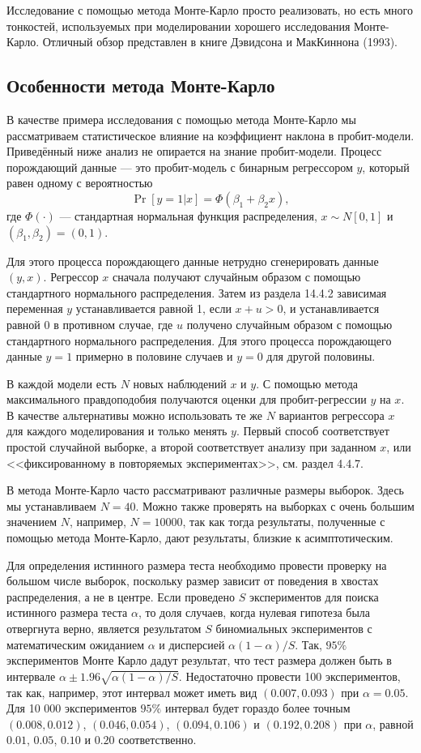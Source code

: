 Исследование с помощью метода Монте-Карло просто реализовать, но есть много тонкостей, используемых при моделировании хорошего исследования Монте-Карло. Отличный обзор представлен в книге Дэвидсона и МакКиннона (1993).


\subsection{Особенности метода Монте-Карло}

В качестве примера исследования с помощью метода Монте-Карло мы рассматриваем статистическое влияние на коэффициент наклона в пробит-модели. Приведённый ниже анализ не опирается на знание пробит-модели. Процесс порождающий данные --- это пробит-модель с бинарным регрессором $y$, который равен одному с вероятностью
\[
\Pr[y = 1|x] = \Phi(\beta_1 + \beta_2 x),
\]
где $\Phi(\cdot)$ --- стандартная нормальная функция распределения, $x \sim N[0,1]$ и $(\beta_1,\beta_2) = (0, 1)$.

Для этого процесса порождающего данные нетрудно сгенерировать данные $(y,x)$. Регрессор $x$ сначала получают случайным образом с помощью стандартного нормального распределения. Затем из раздела 14.4.2 зависимая переменная $y$ устанавливается равной 1, если $x + u > 0$, и устанавливается равной 0 в противном случае, где $u$ получено случайным образом с помощью стандартного нормального распределения. Для этого процесса порождающего данные $y = 1$ примерно в половине случаев
и $y = 0$ для другой половины.

В каждой модели есть $N$ новых наблюдений $x$ и $y$. С помощью метода максимального правдоподобия получаются оценки для пробит-регрессии $y$ на $x$. В качестве альтернативы можно использовать те же $N$ вариантов регрессора $x$ для каждого моделирования и только менять $y$. Первый способ соответствует простой случайной выборке, а второй соответствует анализу при заданном $x$, или <<фиксированному в повторяемых экспериментах>>, см. раздел 4.4.7.

В метода Монте-Карло часто рассматривают различные размеры выборок. Здесь мы устанавливаем $N = 40$. Можно также проверять на выборках с очень большим значением $N$, например, $N = 10 000$, так как тогда результаты, полученные с помощью метода Монте-Карло, дают результаты, близкие к асимптотическим.

Для определения истинного размера теста необходимо провести проверку на большом числе выборок, поскольку размер зависит от поведения в хвостах распределения, а не в центре. Если проведено $S$ экспериментов для поиска истинного размера теста $\alpha$, то доля случаев, когда нулевая гипотеза была отвергнута верно, является результатом $S$ биномиальных экспериментов с математическим ожиданием $\alpha$ и дисперсией $\alpha(1 - \alpha)/S$. Так, $95\%$ экспериментов Монте Карло дадут результат, что тест размера должен быть в интервале $\alpha \pm 1.96 \sqrt{\alpha(1 - \alpha)/S}$. Недостаточно провести 100 экспериментов, так как, например, этот интервал может иметь вид $(0.007, 0.093)$ при $\alpha = 0.05$. Для 10 000 экспериментов $95\%$ интервал будет гораздо более точным $(0.008, 0.012)$, $(0.046, 0.054)$, $(0.094, 0.106)$ и $(0.192, 0.208)$ при $\alpha$, равной $0.01$, $0.05$, $0.10$ и $0.20$ соответственно.

